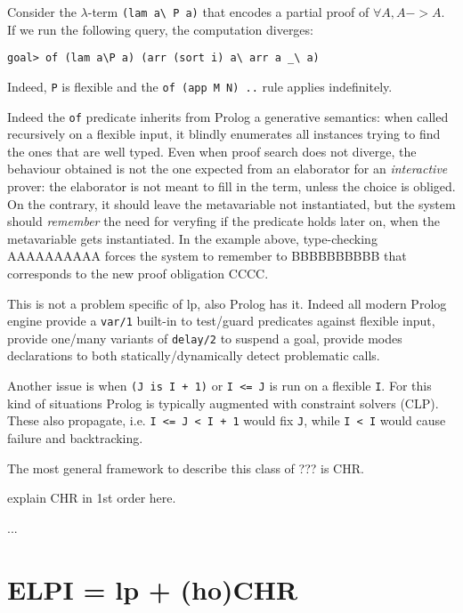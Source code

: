 \documentclass{easychair}
\begin{document}
Consider the $\lambda$-term \verb+(lam a\ P a)+ that encodes a
partial proof of $\forall A, A -> A$.
If we run the following query, the computation diverges:

\begin{verbatim}
goal> of (lam a\P a) (arr (sort i) a\ arr a _\ a)
\end{verbatim}

Indeed, \verb+P+ is flexible and the \verb+of (app M N) ..+
rule applies indefinitely.

Indeed the \verb+of+ predicate inherits from Prolog a generative semantics:
when called recursively on a flexible input, it blindly enumerates all
instances trying to find the ones that are well typed. Even when proof
search does not diverge, the behaviour obtained is not the one
expected from an elaborator for an \emph{interactive} prover: the
elaborator is not meant to fill in the term, unless the choice is
obliged. On the contrary, it should leave the metavariable not
instantiated, but the system should \emph{remember} the need for
veryfing if the predicate holds later on, when the metavariable gets
instantiated. In the example above, type-checking AAAAAAAAAA forces
the system to remember to BBBBBBBBBB that corresponds to the new proof
obligation CCCC.

This is not a problem specific of lp, also Prolog has it.
Indeed all modern Prolog engine provide a \verb+var/1+ built-in
to test/guard predicates against flexible input, provide one/many
variants of \verb+delay/2+ to suspend a goal, provide modes
declarations to both statically/dynamically detect problematic
calls.

Another issue is when \verb-(J is I + 1)- or \verb+I <= J+ 
is run on a flexible
\verb+I+.  For this kind of situations Prolog is typically augmented
with constraint solvers (CLP).  These also propagate, i.e. 
\verb-I <= J < I + 1- would fix \verb+J+, while \verb+I < I+ would
cause failure and backtracking.

The most general framework to describe this class of ??? is CHR.

explain CHR in 1st order here.

...



\section{ELPI = lp + (ho)CHR}
\end{document}
